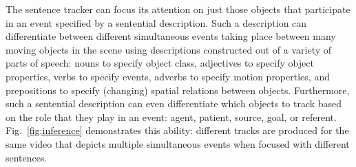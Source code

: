 The sentence tracker can focus its attention on just those objects that
participate in an event specified by a sentential description.
%
Such a description can differentiate between different simultaneous events
taking place between many moving objects in the scene using descriptions
constructed out of a variety of parts of speech: nouns to specify object class,
adjectives to specify object properties, verbs to specify events, adverbs to
specify motion properties, and prepositions to specify (changing) spatial
relations between objects.
%
Furthermore, such a sentential description can even differentiate which objects
to track based on the role that they play in an event: agent, patient, source,
goal, or referent.
%
Fig.~\ref{fig:inference} demonstrates this ability: different tracks are
produced for the same video that depicts multiple simultaneous events when
focused with different sentences.


